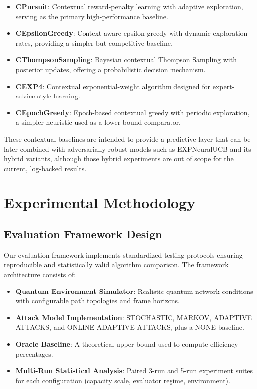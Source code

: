 \documentclass[12pt,a4paper]{article}
\begin{document}
\begin{itemize}
\item \textbf{CPursuit}: Contextual reward-penalty learning with adaptive exploration, serving as the primary high-performance baseline.
\item \textbf{CEpsilonGreedy}: Context-aware epsilon-greedy with dynamic exploration rates, providing a simpler but competitive baseline.
\item \textbf{CThompsonSampling}: Bayesian contextual Thompson Sampling with posterior updates, offering a probabilistic decision mechanism.
\item \textbf{CEXP4}: Contextual exponential-weight algorithm designed for expert-advice-style learning.
\item \textbf{CEpochGreedy}: Epoch-based contextual greedy with periodic exploration, a simpler heuristic used as a lower-bound comparator.
\end{itemize}

These contextual baselines are intended to provide a predictive layer that can be later combined with adversarially robust models such as EXPNeuralUCB and its hybrid variants, although those hybrid experiments are out of scope for the current, log-backed results.

\section{Experimental Methodology}

\subsection{Evaluation Framework Design}

Our evaluation framework implements standardized testing protocols ensuring reproducible and statistically valid algorithm comparison. The framework architecture consists of:

\begin{itemize}
\item \textbf{Quantum Environment Simulator}: Realistic quantum network conditions with configurable path topologies and frame horizons.
\item \textbf{Attack Model Implementation}: STOCHASTIC, MARKOV, ADAPTIVE ATTACKS, and ONLINE ADAPTIVE ATTACKS, plus a NONE baseline.
\item \textbf{Oracle Baseline}: A theoretical upper bound used to compute efficiency percentages.
\item \textbf{Multi-Run Statistical Analysis}: Paired 3-run and 5-run experiment suites for each configuration (capacity scale, evaluator regime, environment).
\end{itemize}
\end{document}
